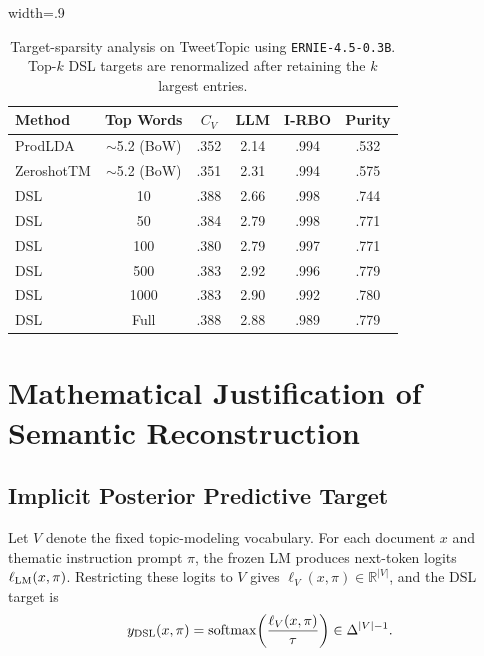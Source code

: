 \documentclass{article}
\theoremstyle{plain}
\theoremstyle{definition}
\theoremstyle{remark}
\begin{document}
\begin{table}[h]
\centering
\begin{adjustbox}{width=.9\linewidth}
\begin{tabular}{lccccc}
\toprule
Method & Top Words & $C_V$ & LLM & I-RBO & Purity \\
\midrule
ProdLDA & $\sim$5.2 (BoW) & .352 & 2.14 & .994 & .532 \\
ZeroshotTM & $\sim$5.2 (BoW) & .351 & 2.31 & .994 & .575 \\
DSL & 10 & .388 & 2.66 & .998 & .744 \\
DSL & 50 & .384 & 2.79 & .998 & .771 \\
DSL & 100 & .380 & 2.79 & .997 & .771 \\
DSL & 500 & .383 & 2.92 & .996 & .779 \\
DSL & 1000 & .383 & 2.90 & .992 & .780 \\
DSL & Full & .388 & 2.88 & .989 & .779 \\
\bottomrule
\end{tabular}
\end{adjustbox}
\vspace{.5em}
\caption{Target-sparsity analysis on TweetTopic using \texttt{ERNIE-4.5-0.3B}. Top-$k$ DSL targets are renormalized after retaining the $k$ largest entries.}
\label{tab:target-sparsity}
\vspace{-1em}
\end{table}

\section{Mathematical Justification of Semantic Reconstruction}
\label{app:semantic-justification}


\subsection{Implicit Posterior Predictive Target}

Let $V$ denote the fixed topic-modeling vocabulary. For each document $x$ and thematic instruction prompt $\pi$, the frozen LM produces next-token logits $\ell_{\rm LM}(x,\pi)$. Restricting these logits to $V$ gives $\ell_V(x,\pi)\in\mathbb{R}^{|V|}$, and the DSL target is
\begin{equation}
y_{\rm DSL}(x,\pi)
=
\mathrm{softmax}\!\left(\frac{\ell_V(x,\pi)}{\tau}\right)
\in \Delta^{|V|-1}.
\label{eq:app-y-dsl}
\end{equation}
\end{document}
